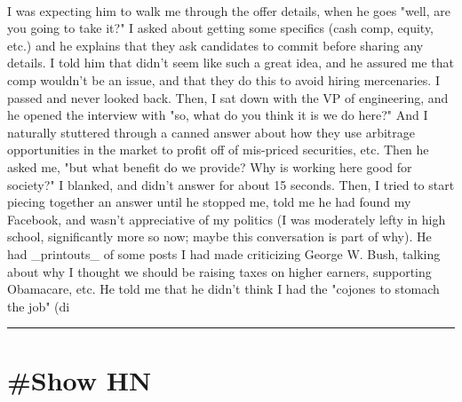\documentclass[10pt,a4paper]{article}
\begin{document}
\begin{multicols*}{2}
\paragraph{}
 I was expecting him to walk me through the offer details, when he goes "well, are you going to take it?" I asked about getting some specifics (cash comp, equity, etc.) and he explains that they ask candidates to commit before sharing any details.
I told him that didn't seem like such a great idea, and he assured me that comp wouldn't be an issue, and that they do this to avoid hiring mercenaries. I passed and never looked back.
Then, I sat down with the VP of engineering, and he opened the interview with "so, what do you think it is we do here?" And I naturally stuttered through a canned answer about how they use arbitrage opportunities in the market to profit off of mis-priced securities, etc. Then he asked me, "but what benefit do we provide? Why is working here good for society?"
I blanked, and didn't answer for about 15 seconds. Then, I tried to start piecing together an answer until he stopped me, told me he had found my Facebook, and wasn't appreciative of my politics (I was moderately lefty in high school, significantly more so now; maybe this conversation is part of why). He had \_printouts\_ of some posts I had made criticizing George W. Bush, talking about why I thought we should be raising taxes on higher earners, supporting Obamacare, etc. He told me that he didn't think I had the "cojones to stomach the job" (di
\par\noindent\textcolor{red}{\rule{\linewidth}{0.2mm}}
\vfill
\null
\end{multicols*}

\newpage
\section{\#Show HN}
\end{document}
